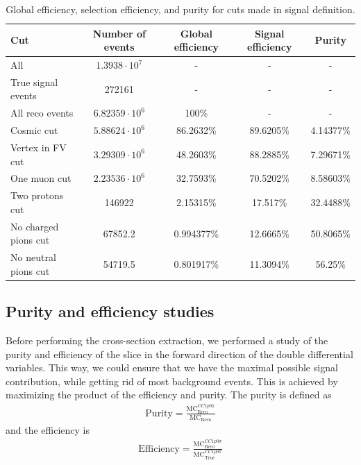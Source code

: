 \documentclass{article}
\begin{document}
\begin{table}
    \begin{center}
        \begin{tabular}{|l|cccc|}
        \hline
        \textbf{Cut}         & \textbf{Number of events} & \textbf{Global efficiency} & \textbf{Signal efficiency} & \textbf{Purity} \\ \hline
        All                  & $1.3938\cdot10^7$ & -       & -       & -      \\
        True signal events   & 272161 & -       & -       & -      \\
        All reco events      & $6.82359\cdot10^6$ & 100\%   & -       & -      \\
        Cosmic cut           & $5.88624\cdot10^6$ & 86.2632\% & 89.6205\% & 4.14377\% \\
        Vertex in FV cut     & $3.29309\cdot10^6$ & 48.2603\% & 88.2885\% & 7.29671\% \\
        One muon cut         & $2.23536\cdot10^6$ & 32.7593\% & 70.5202\% & 8.58603\% \\
        Two protons cut      & 146922 & 2.15315\%  & 17.517\% & 32.4488\% \\
        No charged pions cut & 67852.2 & 0.994377\%  & 12.6665\% & 50.8065\% \\
        No neutral pions cut & 54719.5 & 0.801917\%  & 11.3094\% & 56.25\% \\ \hline
        \end{tabular}
    \end{center}
    \caption{Global efficiency, selection efficiency, and purity for cuts made in signal definition.}
    \label{table:cut-efficiency-purity}
\end{table}

\clearpage

\subsection{Purity and efficiency studies}

Before performing the cross-section extraction, we performed a study of the purity and efficiency of the slice in the forward 
direction of the double differential variables. This way, we could ensure that we have the maximal possible signal contribution, 
while getting rid of most background events. This is achieved by maximizing the product of the efficiency and purity. 
The purity is defined as 
\begin{align}
    \text{Purity} = \frac{\text{MC}^{CC1p0\pi}_{\text{Reco}}}{\text{MC}_{\text{Reco}}}
\end{align}
and the efficiency is 
\begin{align}
    \text{Efficiency} = \frac{\text{MC}^{CC1p0\pi}_{\text{Reco}}}{\text{MC}^{CC1p0\pi}_{\text{True}}}
\end{align}
\end{document}
